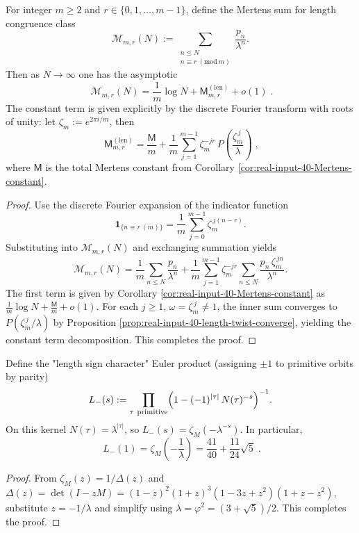 \begin{theorem}\label{thm:real-input-40-length-mertens-prog}
For integer \(m\ge 2\) and \(r\in\{0,1,\dots,m-1\}\), define the Mertens sum for length congruence class
\[
\mathcal{M}_{m,r}(N):=\sum_{\substack{n\le N\\ n\equiv r\ (\mathrm{mod}\ m)}}\frac{p_n}{\lambda^n}.
\]
Then as \(N\to\infty\) one has the asymptotic
\[
\boxed{\;
\mathcal{M}_{m,r}(N)=\frac{1}{m}\log N+\mathsf{M}^{(\mathrm{len})}_{m,r}+o(1)\; }.
\]
The constant term is given explicitly by the discrete Fourier transform with roots of unity: let \(\zeta_m:=e^{2\pi i/m}\), then
\[
\boxed{\;
\mathsf{M}^{(\mathrm{len})}_{m,r}
=\frac{\mathsf{M}}{m}+\frac{1}{m}\sum_{j=1}^{m-1}\zeta_m^{-jr}\,P\!\left(\frac{\zeta_m^{\,j}}{\lambda}\right)\; },
\]
where \(\mathsf{M}\) is the total Mertens constant from Corollary \ref{cor:real-input-40-Mertens-constant}.
\end{theorem}
\begin{proof}
Use the discrete Fourier expansion of the indicator function
\[
\mathbf{1}_{\{n\equiv r\ (m)\}}
=\frac{1}{m}\sum_{j=0}^{m-1}\zeta_m^{\,j(n-r)}.
\]
Substituting into \(\mathcal{M}_{m,r}(N)\) and exchanging summation yields
\[
\mathcal{M}_{m,r}(N)
=\frac{1}{m}\sum_{n\le N}\frac{p_n}{\lambda^n}+\frac{1}{m}\sum_{j=1}^{m-1}\zeta_m^{-jr}\sum_{n\le N}\frac{p_n\,\zeta_m^{\,jn}}{\lambda^n}.
\]
The first term is given by Corollary \ref{cor:real-input-40-Mertens-constant} as
\(
\frac{1}{m}\log N+\frac{\mathsf{M}}{m}+o(1)
\).
For each \(j\ge 1\), \(\omega=\zeta_m^{\,j}\neq 1\), the inner sum converges to \(P(\zeta_m^{\,j}/\lambda)\) by Proposition \ref{prop:real-input-40-length-twist-converge}, yielding the constant term decomposition. This completes the proof.
\end{proof}
\begin{corollary}\label{cor:real-input-40-length-sign-L1}
Define the "length sign character" Euler product (assigning \(\pm 1\) to primitive orbits by parity)
\[
L_-(s):=\prod_{\tau\ \mathrm{primitive}}\Bigl(1-(-1)^{|\tau|}\,N(\tau)^{-s}\Bigr)^{-1}.
\]
On this kernel \(N(\tau)=\lambda^{|\tau|}\), so \(L_-(s)=\zeta_M(-\lambda^{-s})\). In particular,
\[
\boxed{\;
L_-(1)=\zeta_M\!\left(-\frac{1}{\lambda}\right)
=\frac{41}{40}+\frac{11}{24}\sqrt5\; }.
\]
\end{corollary}
\begin{proof}
From \(\zeta_M(z)=1/\Delta(z)\) and \(\Delta(z)=\det(I-zM)=(1-z)^2(1+z)^3(1-3z+z^2)(1+z-z^2)\), substitute \(z=-1/\lambda\) and simplify using \(\lambda=\varphi^2=(3+\sqrt5)/2\). This completes the proof.
\end{proof}
